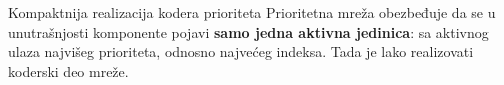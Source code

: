 \begin{frame}[t,label=03-s018]{Kompaktnija realizacija kodera prioriteta}
\setlength{\parskip}{0pt}
Prioritetna mreža obezbeđuje da se u unutrašnjosti komponente pojavi
\textbf{samo jedna aktivna jedinica}: sa aktivnog ulaza najvišeg prioriteta,
odnosno najvećeg indeksa. Tada je lako realizovati koderski deo mreže.
\par\vspace{2mm}
{\centering\par}
\par\vspace{1mm}
\end{frame}
